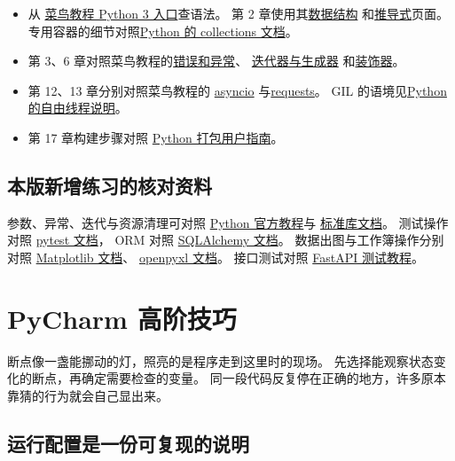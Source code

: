 \documentclass[UTF8,a4paper,oneside,openany,fontset=none,11pt]{ctexbook}
\begin{document}
\begin{itemize}
  \item 从 \href{https://www.runoob.com/python3}{菜鸟教程 Python 3 入口}查语法。
    第 2 章使用其\href{https://www.runoob.com/python3/python3-data-structure.html}{数据结构}
    和\href{https://www.runoob.com/python3/python-comprehensions.html}{推导式}页面。
    专用容器的细节对照\href{https://docs.python.org/3/library/collections.html}{Python 的 collections 文档}。
  \item 第 3、6 章对照菜鸟教程的\href{https://www.runoob.com/python3/python3-errors-execptions.html}{错误和异常}、
    \href{https://www.runoob.com/python3/python3-iterator-generator.html}{迭代器与生成器}
    和\href{https://www.runoob.com/python3/python-decorators.html}{装饰器}。
  \item 第 12、13 章分别对照菜鸟教程的
    \href{https://www.runoob.com/python3/python-asyncio.html}{asyncio}
    与\href{https://www.runoob.com/python3/python-requests.html}{requests}。
    GIL 的语境见\href{https://docs.python.org/3/howto/free-threading-python.html}{Python 的自由线程说明}。
  \item 第 17 章构建步骤对照
    \href{https://packaging.python.org/en/latest/tutorials/packaging-projects/}{Python 打包用户指南}。
\end{itemize}

\section*{本版新增练习的核对资料}
参数、异常、迭代与资源清理可对照
\href{https://docs.python.org/3/tutorial/}{Python 官方教程}与
\href{https://docs.python.org/3/library/}{标准库文档}。
测试操作对照 \href{https://docs.pytest.org/en/stable/}{pytest 文档}，
ORM 对照 \href{https://docs.sqlalchemy.org/}{SQLAlchemy 文档}。
数据出图与工作簿操作分别对照
\href{https://matplotlib.org/stable/}{Matplotlib 文档}、
\href{https://openpyxl.readthedocs.io/}{openpyxl 文档}。
接口测试对照 \href{https://fastapi.tiangolo.com/tutorial/testing/}{FastAPI 测试教程}。


\chapter{PyCharm 高阶技巧}

断点像一盏能挪动的灯，照亮的是程序走到这里时的现场。
先选择能观察状态变化的断点，再确定需要检查的变量。
同一段代码反复停在正确的地方，许多原本靠猜的行为就会自己显出来。

\section{运行配置是一份可复现的说明}
\end{document}
